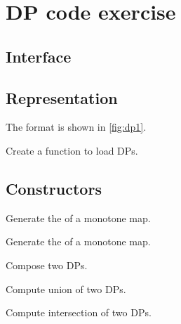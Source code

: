 \section{DP code exercise}

\label{sec:exercises-DP}

\subsection*{Interface}

\subsection*{Representation}

The format is shown in \cref{fig:dp1}.


\begin{codeexercise}
    Create a function to load DPs.
\end{codeexercise}

\subsection*{Constructors}

\begin{codeexercise}
    Generate the  of a monotone map.
\end{codeexercise}

\begin{codeexercise}
    Generate the  of a monotone map.
\end{codeexercise}

\begin{codeexercise}
    Compose two DPs.
\end{codeexercise}

\begin{codeexercise}
    Compute union of two DPs.
\end{codeexercise}

\begin{codeexercise}
    Compute intersection of two DPs.
\end{codeexercise}
